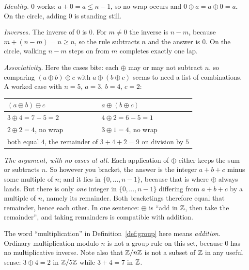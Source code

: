 \emph{Identity.} $0$ works: $a+0=a\le n-1$, so no wrap occurs and $0\oplus a=a\oplus 0=a$. On the
circle, adding $0$ is standing still.

\emph{Inverses.} The inverse of $0$ is $0$. For $m\neq 0$ the inverse is $n-m$, because
$m+(n-m)=n\ge n$, so the rule subtracts $n$ and the answer is $0$. On the circle, walking $n-m$
steps on from $m$ completes exactly one lap.

\emph{Associativity.} Here the cases bite: each $\oplus$ may or may not subtract $n$, so comparing
$(a\oplus b)\oplus c$ with $a\oplus(b\oplus c)$ seems to need a list of combinations. A worked case
with $n=5$, $a=3$, $b=4$, $c=2$:

\begin{center}
\small
\begin{tabular}{@{}ll@{}}
\toprule
$(a\oplus b)\oplus c$ & $a\oplus(b\oplus c)$\\
\midrule
$3\oplus4=7-5=2$ & $4\oplus2=6-5=1$\\
$2\oplus2=4$, no wrap & $3\oplus1=4$, no wrap\\
\midrule
\multicolumn{2}{c}{both equal $4$, the remainder of $3+4+2=9$ on division by $5$}\\
\bottomrule
\end{tabular}
\end{center}

\begin{why}
\emph{The argument, with no cases at all.} Each application of $\oplus$ either keeps the sum or
subtracts $n$. So however you bracket, the answer is the integer $a+b+c$ minus some multiple of
$n$; and it lies in $\{0,\dots,n-1\}$, because that is where $\oplus$ always lands. But there is
only \emph{one} integer in $\{0,\dots,n-1\}$ differing from $a+b+c$ by a multiple of $n$, namely its
remainder. Both bracketings therefore equal that remainder, hence each other. In one sentence:
$\oplus$ is ``add in $\mathbb{Z}$, then take the remainder'', and taking remainders is compatible with
addition.
\end{why}

\begin{pitfall}
The word ``multiplication'' in Definition~\ref{def:group} here means \emph{addition}. Ordinary
multiplication modulo $n$ is not a group rule on this set, because $0$ has no multiplicative
inverse. Note also that $\mathbb{Z}/n\mathbb{Z}$ is not a subset of $\mathbb{Z}$ in any useful sense: $3\oplus 4=2$ in
$\mathbb{Z}/5\mathbb{Z}$ while $3+4=7$ in $\mathbb{Z}$.
\end{pitfall}

